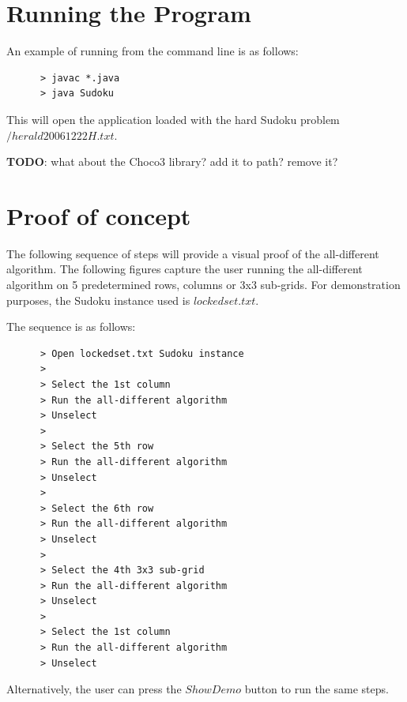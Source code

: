 \documentclass{l4proj}
\begin{document}
\begin{appendices}

\chapter{Running the Program}
An example of running from the command line is as follows:
\begin{verbatim}
      > javac *.java
      > java Sudoku
\end{verbatim}
This will open the application loaded with the hard Sudoku problem $/herald20061222H.txt$.

\noindent
\textbf{TODO}: what about the Choco3 library? add it to path? remove it?

\chapter{Proof of concept}

The following sequence of steps will provide a visual proof of the all-different algorithm. The following figures capture the user running the all-different algorithm on 5 predetermined rows, columns or 3x3 sub-grids. For demonstration purposes, the Sudoku instance used is $lockedset.txt$.

\noindent The sequence is as follows:
\begin{verbatim}
      > Open lockedset.txt Sudoku instance
      >
      > Select the 1st column
      > Run the all-different algorithm
      > Unselect
      >
      > Select the 5th row
      > Run the all-different algorithm
      > Unselect
      >
      > Select the 6th row
      > Run the all-different algorithm
      > Unselect
      >
      > Select the 4th 3x3 sub-grid
      > Run the all-different algorithm
      > Unselect
      >
      > Select the 1st column
      > Run the all-different algorithm
      > Unselect
\end{verbatim}

\noindent Alternatively, the user can press the $Show Demo$ button to run the same steps.


\end{appendices}
\end{document}
